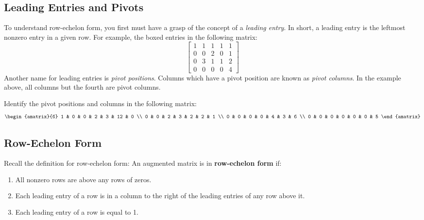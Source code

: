 \documentclass[11pt]{exam}
\begin{document}
    \subsection{Leading Entries and Pivots}
        To understand row-echelon form, you first must have a grasp of the concept of a \textit{leading entry}.
        In short, a leading entry is the leftmost nonzero entry in a given row. For example, the boxed entries in the following matrix:
        $$\begin{bmatrix}
            \boxed{1} & 1 & 1 & 1 & 1 \\
            0 & 0 & \boxed{2} & 0 & 1 \\
            0 & \boxed{3} & 1 & 1 & 2 \\
            0 & 0 & 0 & 0 & \boxed{4}
        \end{bmatrix}$$
        Another name for leading entries is \textit{pivot positions}. Columns which have a pivot position are known as \textit{pivot columns}.
        In the example above, all columns but the fourth are pivot columns.
        \begin{questions}
            \item Identify the pivot positions and columns in the following matrix:
            $$\begin{amatrix}{6}
                1 & 0 & 0 & 2 & 3 & 12 & 0 \\
                0 & 0 & 2 & 3 & 2 & 2 & 1 \\
                0 & 0 & 0 & 0 & 4 & 3 & 6 \\
                0 & 0 & 0 & 0 & 0 & 0 & 5
            \end{amatrix}$$
        \end{questions}
    
    \vspace{20px}
    \subsection{Row-Echelon Form}
        Recall the definition for row-echelon form:
        An augmented matrix is in \textbf{row-echelon form} if:
        \begin{enumerate}
            \item All nonzero rows are above any rows of zeros.
            \item Each leading entry of a row is in a column to the right of the leading entries of any row above it.
            \item Each leading entry of a row is equal to 1.
        \end{enumerate}
\end{document}
